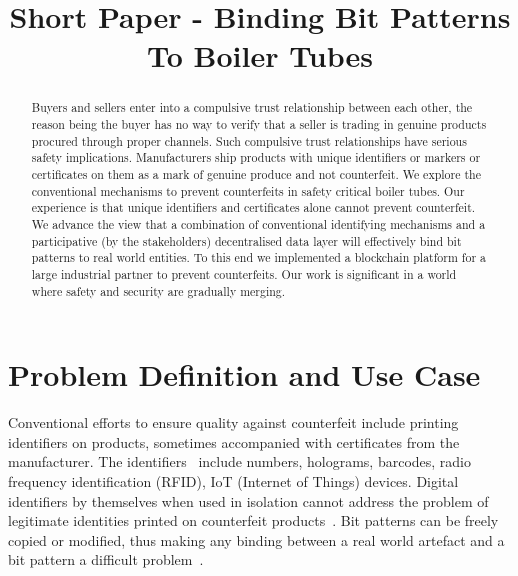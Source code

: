 \documentclass{article}
\begin{document}
%
\title{Short Paper - Binding Bit Patterns To Boiler Tubes}
%
%
%
%
%
\maketitle              %
%
\begin{abstract}
Buyers and sellers enter into a compulsive trust relationship between each other, the reason being the buyer has no way to verify that a seller is trading in genuine products procured through proper channels. Such compulsive  trust relationships have serious safety implications. Manufacturers ship products with unique identifiers or markers or certificates on them as a mark of genuine produce and not counterfeit. We explore the conventional mechanisms to prevent counterfeits in safety critical boiler tubes. Our experience is that unique identifiers and certificates alone cannot prevent counterfeit. We advance the view that a combination of conventional identifying mechanisms and a participative (by the stakeholders) decentralised data layer will effectively bind bit patterns to real world entities.  To this end we implemented a blockchain platform for a large industrial partner to prevent counterfeits. Our work is significant in a world where safety and security are gradually merging. 

\end{abstract}
%
%
%
\section{Problem Definition and Use Case}
Conventional efforts to ensure quality against counterfeit include printing identifiers on products, sometimes accompanied with certificates from the manufacturer. The identifiers~\cite{rja} include numbers, holograms, barcodes, radio frequency identification (RFID), IoT (Internet of Things) devices. Digital identifiers by themselves when used in isolation cannot address the problem of legitimate identities printed on counterfeit products~\cite{rja}. Bit patterns can be freely copied or modified, thus making any binding between a real world artefact and a bit pattern a difficult problem~\cite{binding}. %
\end{document}
